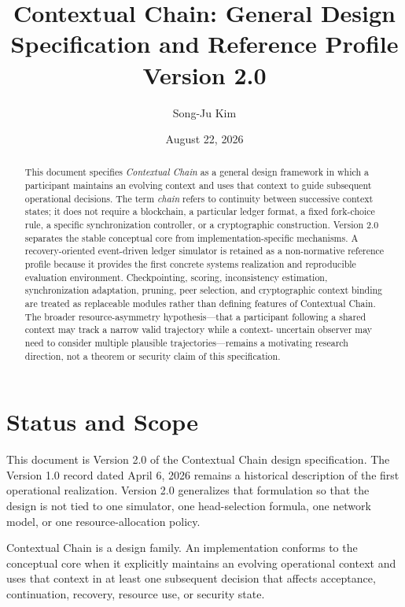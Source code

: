 \documentclass[11pt]{article}
\title{Contextual Chain: General Design Specification and Reference Profile\\
\large Version 2.0}
\author{Song-Ju Kim}
\date{August 22, 2026}
\begin{document}
\maketitle

\begin{abstract}
This document specifies \emph{Contextual Chain} as a general design framework in which
a participant maintains an evolving context and uses that context to guide subsequent
operational decisions. The term \emph{chain} refers to continuity between successive context
states; it does not require a blockchain, a particular ledger format, a fixed fork-choice rule, a
specific synchronization controller, or a cryptographic construction. Version 2.0 separates
the stable conceptual core from implementation-specific mechanisms. A recovery-oriented
event-driven ledger simulator is retained as a non-normative reference profile because it
provides the first concrete systems realization and reproducible evaluation environment.
Checkpointing, scoring, inconsistency estimation, synchronization adaptation, pruning, peer
selection, and cryptographic context binding are treated as replaceable modules rather than
defining features of Contextual Chain. The broader resource-asymmetry hypothesis---that a
participant following a shared context may track a narrow valid trajectory while a context-
uncertain observer may need to consider multiple plausible trajectories---remains a motivating
research direction, not a theorem or security claim of this specification.
\end{abstract}

\tableofcontents

\section{Status and Scope}
This document is Version 2.0 of the Contextual Chain design specification. The Version 1.0
record dated April 6, 2026 remains a historical description of the first operational realization.
Version 2.0 generalizes that formulation so that the design is not tied to one simulator, one
head-selection formula, one network model, or one resource-allocation policy.

Contextual Chain is a design family. An implementation conforms to the conceptual core
when it explicitly maintains an evolving operational context and uses that context in at least
one subsequent decision that affects acceptance, continuation, recovery, resource use, or security
state.
\end{document}
